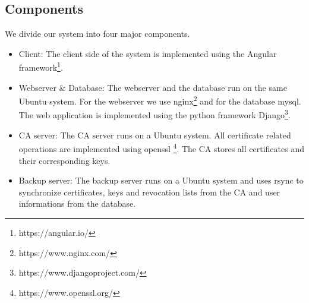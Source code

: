 \documentclass[english]{article}
\begin{document}









\subsection{Components}

We divide our system into four major components.
\begin{itemize}
\item Client: The client side of the system is implemented using the Angular framework\footnote{https://angular.io/}.
\item Webserver \& Database: The webserver and the database run on the same Ubuntu system. For the webserver we use nginx\footnote{https://www.nginx.com/} and for the database mysql. The web application is implemented using the python framework Django\footnote{https://www.djangoproject.com/}.
\item CA server: The CA server runs on a Ubuntu system. All certificate related operations are implemented using openssl \footnote{https://www.openssl.org/}. The CA stores all certificates and their corresponding keys.
\item Backup server: The backup server runs on a Ubuntu system and uses rsync to synchronize certificates, keys and revocation lists from the CA and user informations from the database.
\end{itemize}

  
\end{document}

